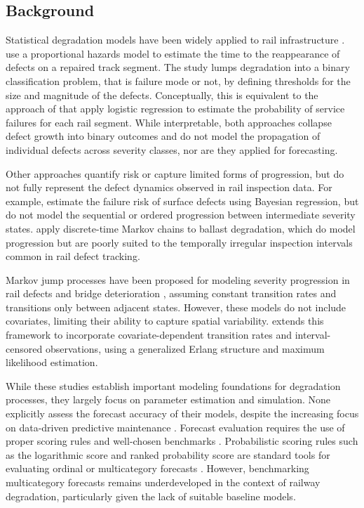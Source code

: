 \subsection{Background} \label{sec:background}%
Statistical degradation models have been widely applied to rail infrastructure \citep{Davari2021AIndustry}.
\citet{ghofrani2019a} use a proportional hazards model to estimate the time to the reappearance of defects on a repaired track segment. The study lumps degradation into a binary classification problem, that is failure mode or not, by defining thresholds for the size and magnitude of the defects. Conceptually, this is equivalent to the approach of \citet{dick2003a} that apply logistic regression to estimate the probability of service failures for each rail segment. While interpretable, both approaches collapse defect growth into binary outcomes and do not model the propagation of individual defects across severity classes, nor are they applied for forecasting.

Other approaches quantify risk or capture limited forms of progression, but do not fully represent the defect dynamics observed in rail inspection data. For example, \citet{jamshidi2016a} estimate the failure risk of surface defects using Bayesian regression, but do not model the sequential or ordered progression between intermediate severity states. \citet{bressi2021a} apply discrete-time Markov chains to ballast degradation, which do model progression but are poorly suited to the temporally irregular inspection intervals common in rail defect tracking.

Markov jump processes have been proposed for modeling severity progression in rail defects \citep{podofillini2006a} and bridge deterioration \citep{sun2024a}, assuming constant transition rates and transitions only between adjacent states. However, these models do not include covariates, limiting their ability to capture spatial variability. \citet{bisgaard2024A} extends this framework to incorporate covariate-dependent transition rates and interval-censored observations, using a generalized Erlang structure and maximum likelihood estimation.

While these studies establish important modeling foundations for degradation processes, they largely focus on parameter estimation and simulation. None explicitly assess the forecast accuracy of their models, despite the increasing focus on data-driven predictive maintenance \citep{Binder2023}. Forecast evaluation requires the use of proper scoring rules \citep{Gneiting2007} and well-chosen benchmarks \citep{Hyndman2014}. Probabilistic scoring rules such as the logarithmic score and ranked probability score are standard tools for evaluating ordinal or multicategory forecasts \citep{Epstein1969,friedman1983a}. However, benchmarking multicategory forecasts remains underdeveloped in the context of railway degradation, particularly given the lack of suitable baseline models.

